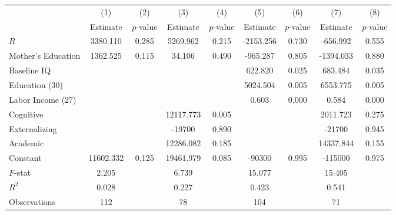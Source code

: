 \begin{tabular}{lcccccccc} \toprule
 & (1) & (2) & (3) & (4) & (5) & (6) & (7) & (8) \\ 
 & Estimate  & $p$-value  & Estimate  & $p$-value  & Estimate  & $p$-value  & Estimate  & $p$-value  \\  \midrule
$R$ &  3380.110 &     0.285 &  5269.962 &     0.215 & -2153.256 &     0.730 &  -656.992 &     0.555 \\  
Mother's Education &  1362.525 &     0.115 &    34.106 &     0.490 &  -965.287 &     0.805 & -1394.033 &     0.880 \\  
Baseline IQ &         &         &         &         &   622.820 &     0.025 &   683.484 &     0.035 \\  
Education (30) &         &         &         &         &  5024.504 &     0.005 &  6553.775 &     0.005 \\  
Labor Income (27) &         &         &         &         &     0.603 &     0.000 &     0.584 &     0.000 \\  
Cognitive &         &         & 12117.773 &     0.005 &         &         &  2011.723 &     0.275 \\  
Externalizing &         &         & -19700 &     0.890 &         &         & -21700 &     0.945 \\  
Academic &         &         & 12286.082 &     0.185 &         &         & 14337.844 &     0.155 \\  
Constant & 11602.332 &     0.125 & 19461.979 &     0.085 & -90300 &     0.995 & -115000 &     0.975 \\  \midrule
$F$-stat &     2.205 &         &     6.739 &         &    15.077 &         &    15.405 &         \\  
$R^2$ &     0.028 &         &     0.227 &         &     0.423 &         &     0.541 &         \\  
Observations &   112 &         &    78 &         &   104 &         &    71 &         \\  
\bottomrule
\end{tabular}

